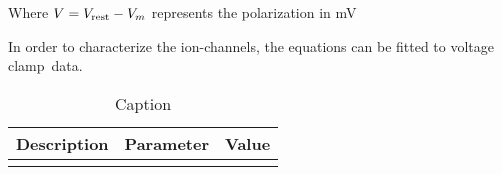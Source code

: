 \documentclass[../../Orator.tex]{subfiles}
\begin{document}
Where \(V = V_{\mathrm{rest}} - V_m\) represents the polarization in \unit{\milli\volt}

In order to characterize the ion-channels, the equations can be fitted to voltage clamp\footnotemark~data.




\begin{table}[htb]
    \centering
    \caption{Caption}\label{tab:my_label}
    \begin{tabular}{p{}p{}p{}}\hline
        Description & Parameter & Value \\\hline
         & &
    \end{tabular}
\end{table}

\begin{comment}
    Breaking down the equation we find the following regions:
    \begin{equation*}
        I = 
        \overbrace{C_m \ode{V_m}{t}}^{\mathclap{\text{rate of change of voltage scaled by capacitance}}} + 
        \bar{g}_\rmm{K} n^4 \br{V_m - V_\rmm{K}} + 
        \bar{g}_\rmm{Na} m^3 h \br{V_m - V_\rmm{Na}}  + 
        \bar{g}_\rmm{L} \br{V_m - V_\rmm{L}} 
    \end{equation*}




    \begin{figure}[h]
        \centering
        \begin{tikzpicture}
            
            \draw (0,0) circle (0.25);
            
        \end{tikzpicture}
        \caption{fart}\label{<label>}
    \end{figure}
\end{comment}
\end{document}
